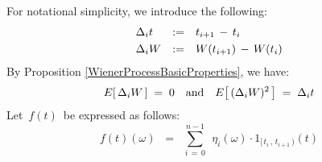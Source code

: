 \proof
For notational simplicity, we introduce the following:
\begin{equation*}
\begin{array}{lcl}
\Delta_{i}t & := & t_{i+1} \, - \, t_{i}
\\
\Delta_{i}W & \overset{{\color{white}1}}{:=} & W(t_{i+1}) \,\overset{{\color{white}.}}{-}\, W(t_{i})
\end{array}
\end{equation*}
By Proposition \ref{WienerProcessBasicProperties}, we have:
\begin{equation*}
E\!\left[\,\Delta_{i}W\,\right] \; = \; 0
\quad\textnormal{and}\quad
E\!\left[\,(\Delta_{i}W)^{2}\,\right] \; = \; \Delta_{i}t
\end{equation*}
Let \,$f(t)$\, be expressed as follows:
\begin{equation*}
f(t)(\omega)
\;\; = \;\;
	\overset{n-1}{\underset{i\,=\,0}{\sum}}\;\,
	\eta_{i}(\omega) \cdot 1_{[\,t_{i}\,,\,t_{i+1}\,)}(t)
\end{equation*}
